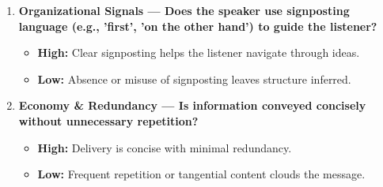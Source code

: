 \documentclass{report}
\begin{document}
\begin{enumerate}
  \item \textbf{Organizational Signals — Does the speaker use signposting language (e.g., 'first', 'on the other hand') to guide the listener?}
  \begin{itemize}
    \item \textbf{High:} Clear signposting helps the listener navigate through ideas.
    \item \textbf{Low:} Absence or misuse of signposting leaves structure inferred.
  \end{itemize}

  \item \textbf{Economy \& Redundancy — Is information conveyed concisely without unnecessary repetition?}
  \begin{itemize}
    \item \textbf{High:} Delivery is concise with minimal redundancy.
    \item \textbf{Low:} Frequent repetition or tangential content clouds the message.
  \end{itemize}
\end{enumerate}
\end{document}
